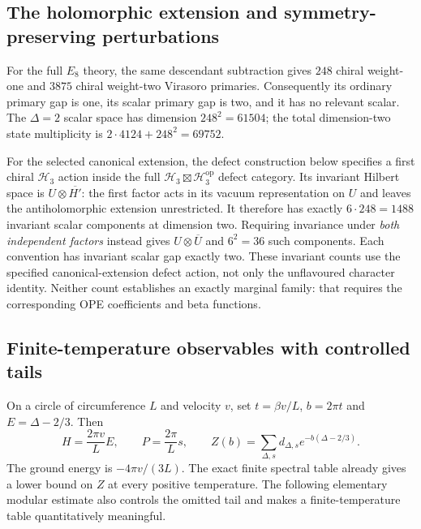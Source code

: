 \subsection{The holomorphic extension and symmetry-preserving perturbations}

For the full $E_8$ theory, the same descendant subtraction gives
$248$ chiral weight-one and $3875$ chiral weight-two Virasoro
primaries.  Consequently its ordinary primary gap is one, its scalar
primary gap is two, and it has no relevant scalar.  The
$\Delta=2$ scalar space has dimension $248^2=61504$; the total
dimension-two state multiplicity is
$2\cdot4124+248^2=69752$.

For the selected canonical extension, the defect construction below
specifies a first chiral $\mathcal H_3$ action inside the full
$\mathcal H_3\boxtimes\mathcal H_3^{\mathrm{op}}$ defect category.
Its invariant Hilbert space is
$U\otimes\overline{H'}$: the first factor acts in its vacuum
representation on $U$ and leaves the antiholomorphic extension
unrestricted.  It therefore has exactly $6\cdot248=1488$ invariant
scalar components at dimension two.  Requiring invariance under
\emph{both independent factors} instead gives
$U\otimes\overline U$ and $6^2=36$ such components.  Each convention
has invariant scalar gap exactly two.  These invariant counts use
the specified canonical-extension defect action, not only the
unflavoured character identity.  Neither count establishes an exactly
marginal family: that requires the corresponding OPE coefficients
and beta functions.

\subsection{Finite-temperature observables with controlled tails}

On a circle of circumference $L$ and velocity $v$, set
$t=\beta v/L$, $b=2\pi t$ and $E=\Delta-2/3$.  Then
\[
 H=\frac{2\pi v}{L}E,\qquad
 P=\frac{2\pi}{L}s,\qquad
 Z(b)=\sum_{\Delta,s}d_{\Delta,s}e^{-b(\Delta-2/3)}.
\]
The ground energy is $-4\pi v/(3L)$.  The exact finite spectral table
already gives a lower bound on $Z$ at every positive temperature.
The following elementary modular estimate also controls the omitted
tail and makes a finite-temperature table quantitatively meaningful.

